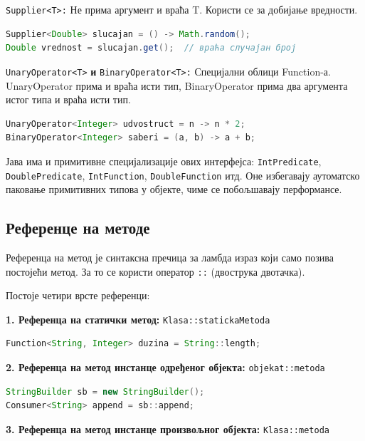 \texttt{Supplier\textless{}T\textgreater{}:} Не прима аргумент и враћа T. Користи се за добијање вредности.

\begin{lstlisting}[language=Java]
Supplier<Double> slucajan = () -> Math.random();
Double vrednost = slucajan.get();  // враћа случајан број
\end{lstlisting}


\texttt{UnaryOperator\textless{}T\textgreater{}}\textbf{ и }\texttt{BinaryOperator\textless{}T\textgreater{}:} Специјални облици Function-а. UnaryOperator прима и враћа исти тип, BinaryOperator прима два аргумента истог типа и враћа исти тип.

\begin{lstlisting}[language=Java]
UnaryOperator<Integer> udvostruct = n -> n * 2;
BinaryOperator<Integer> saberi = (a, b) -> a + b;
\end{lstlisting}


Јава има и примитивне специјализације ових интерфејса: \texttt{IntPredicate}, \texttt{DoublePredicate}, \texttt{IntFunction}, \texttt{DoubleFunction} итд. Оне избегавају аутоматско паковање примитивних типова у објекте, чиме се побољшавају перформансе.


\subsection{Референце на методе}

Референца на метод је синтаксна пречица за ламбда израз који само позива постојећи метод. За то се користи оператор \texttt{::} (двострука двотачка).

Постоје четири врсте референци:

\textbf{1. Референца на статички метод:} \texttt{Klasa::statickaMetoda}

\begin{lstlisting}[language=Java]
Function<String, Integer> duzina = String::length;
\end{lstlisting}


\textbf{2. Референца на метод инстанце одређеног објекта:} \texttt{objekat::metoda}

\begin{lstlisting}[language=Java]
StringBuilder sb = new StringBuilder();
Consumer<String> append = sb::append;
\end{lstlisting}


\textbf{3. Референца на метод инстанце произвољног објекта:} \texttt{Klasa::metoda}

